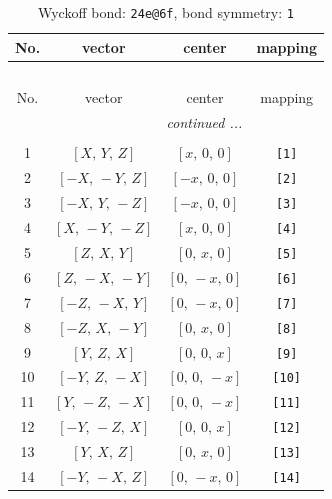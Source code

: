 \documentclass[fleqn,8pt]{jsarticle}
\begin{document}
\begin{longtable}{cccc}
\caption{Wyckoff bond: {\tt 24e@6f}, bond symmetry: {\tt 1}}
 \\
 \hline \hline
No. & vector & center & mapping \\ \hline \endfirsthead

\multicolumn{3}{l}{\tablename\ \thetable{}} \\
 \hline \hline
No. & vector & center & mapping \\ \hline \endhead

 \hline \hline
\multicolumn{3}{r}{\footnotesize\it continued ...} \\ \endfoot

 \hline \hline
\multicolumn{3}{r}{} \\ \endlastfoot

1 & $\left[ X,\, Y,\, Z \right]$ & $\left[ x,\, 0,\, 0 \right]$ & {\tt [1]} \\ \hline
2 & $\left[ - X,\, - Y,\, Z \right]$ & $\left[ - x,\, 0,\, 0 \right]$ & {\tt [2]} \\ \hline
3 & $\left[ - X,\, Y,\, - Z \right]$ & $\left[ - x,\, 0,\, 0 \right]$ & {\tt [3]} \\ \hline
4 & $\left[ X,\, - Y,\, - Z \right]$ & $\left[ x,\, 0,\, 0 \right]$ & {\tt [4]} \\ \hline
5 & $\left[ Z,\, X,\, Y \right]$ & $\left[ 0,\, x,\, 0 \right]$ & {\tt [5]} \\ \hline
6 & $\left[ Z,\, - X,\, - Y \right]$ & $\left[ 0,\, - x,\, 0 \right]$ & {\tt [6]} \\ \hline
7 & $\left[ - Z,\, - X,\, Y \right]$ & $\left[ 0,\, - x,\, 0 \right]$ & {\tt [7]} \\ \hline
8 & $\left[ - Z,\, X,\, - Y \right]$ & $\left[ 0,\, x,\, 0 \right]$ & {\tt [8]} \\ \hline
9 & $\left[ Y,\, Z,\, X \right]$ & $\left[ 0,\, 0,\, x \right]$ & {\tt [9]} \\ \hline
10 & $\left[ - Y,\, Z,\, - X \right]$ & $\left[ 0,\, 0,\, - x \right]$ & {\tt [10]} \\ \hline
11 & $\left[ Y,\, - Z,\, - X \right]$ & $\left[ 0,\, 0,\, - x \right]$ & {\tt [11]} \\ \hline
12 & $\left[ - Y,\, - Z,\, X \right]$ & $\left[ 0,\, 0,\, x \right]$ & {\tt [12]} \\ \hline
13 & $\left[ Y,\, X,\, Z \right]$ & $\left[ 0,\, x,\, 0 \right]$ & {\tt [13]} \\ \hline
14 & $\left[ - Y,\, - X,\, Z \right]$ & $\left[ 0,\, - x,\, 0 \right]$ & {\tt [14]} \\ \hline

\end{longtable}
\end{document}
